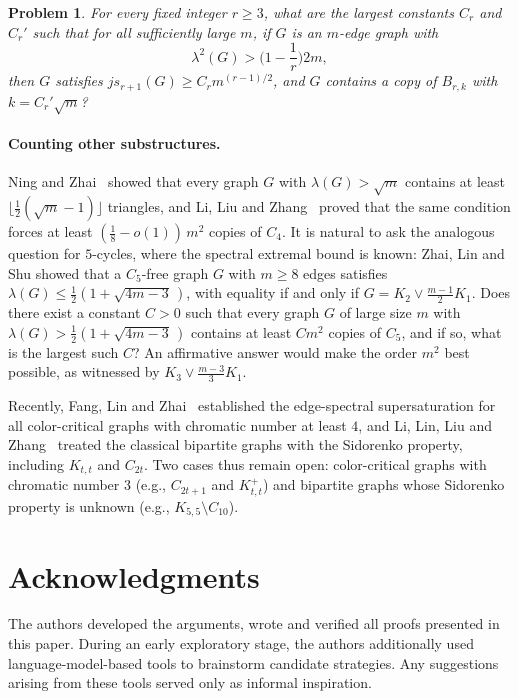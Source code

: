 \documentclass[11pt,a4paper]{article}
\newtheorem{problem}[theorem]{Problem}
\theoremstyle{definition}
\theoremstyle{plain}
\renewcommand{\le}{\leqslant}
\renewcommand{\ge}{\geqslant}
\begin{document}
\begin{problem}
For every fixed integer $r\ge 3$, what are the largest constants $C_r$ and $C_r'$ such that for all sufficiently large $m$, if $G$ is an $m$-edge graph  with 
$$\lambda^2(G) > \Big(1- \frac{1}{r} \Big)2m,$$ 
then $G$ satisfies $js_{r+1}(G)\ge C_r m^{(r-1)/2}$, and $G$ contains a copy of  $B_{r,k}$ with $k= C_r' \sqrt{m}$? 
\end{problem} 


\paragraph{Counting other substructures.} 
Ning and Zhai~\cite{NingZhai2023} showed that every graph $G$ with 
$\lambda(G) > \sqrt{m}$ contains at least $\lfloor \frac{1}{2}(\sqrt{m}-1) \rfloor$ 
triangles, and Li, Liu and Zhang~\cite{LiLiuZhang26} proved that the same condition 
forces at least $(\frac{1}{8} - o(1))\,m^2$ copies of $C_4$. It is natural to ask 
the analogous question for $5$-cycles, where the spectral extremal bound is known: 
Zhai, Lin and Shu \cite{ZLS2021} showed that a $C_5$-free graph $G$ with $m \ge 8$ edges satisfies 
$\lambda(G) \le \frac{1}{2}(1+\sqrt{4m-3}\,)$, with equality if and only if 
$G = K_2 \vee \frac{m-1}{2}K_1$. Does there exist a constant $C>0$ such that every 
graph $G$ of large size $m$ with $\lambda(G) > \frac{1}{2}(1+\sqrt{4m-3}\,)$ 
contains at least $Cm^2$ copies of $C_5$, and if so, what is the largest such $C$? 
An affirmative answer would make the order $m^2$ best possible, as witnessed by $K_3 \vee \frac{m-3}{3}K_1$. 

\medskip 
Recently, Fang, Lin and  Zhai~\cite{FangLinZhai}  established the edge-spectral supersaturation 
for all color-critical graphs with chromatic number at least $4$, 
and Li, Lin, Liu and Zhang~\cite{LLLZ2026} treated the classical bipartite graphs with the Sidorenko property, including $K_{t,t}$ and $C_{2t}$. 
Two cases thus remain open: color-critical graphs with chromatic number $3$ 
(e.g., $C_{2t+1}$ and $K_{t,t}^+$) and bipartite graphs whose Sidorenko property 
is unknown (e.g., $K_{5,5}\setminus C_{10}$). 


\section*{Acknowledgments}
The authors developed the arguments, wrote and verified all proofs presented in this paper. During an early exploratory stage, the authors additionally used language-model-based tools to brainstorm candidate  strategies. Any suggestions arising from these tools served only as informal inspiration. 
\end{document}
